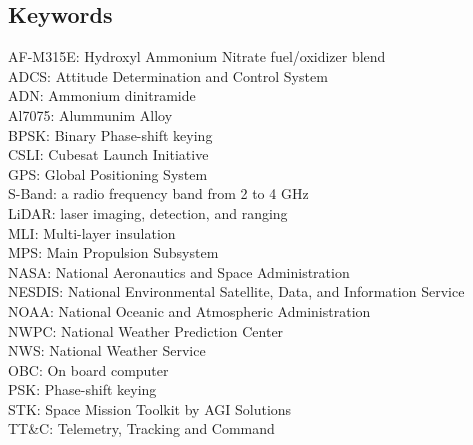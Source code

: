 \newpage
\subsection{Keywords}
AF-M315E: Hydroxyl Ammonium Nitrate fuel/oxidizer blend\\
ADCS: Attitude Determination and Control System\\
ADN: Ammonium dinitramide\\
Al7075: Alummunim Alloy\\
BPSK: Binary Phase-shift keying\\
CSLI: Cubesat Launch Initiative\\
GPS: Global Positioning System\\
S-Band: a radio frequency band from 2 to 4 GHz\\
LiDAR: laser imaging, detection, and ranging\\
MLI: Multi-layer insulation\\
MPS: Main Propulsion Subsystem\\
NASA: National Aeronautics and Space Administration\\
NESDIS: National Environmental Satellite, Data, and Information Service\\
NOAA: National Oceanic and Atmospheric Administration\\
NWPC: National Weather Prediction Center\\
NWS: National Weather Service\\
OBC: On board computer\\
PSK: Phase-shift keying\\
STK: Space Mission Toolkit by AGI Solutions\\
TT\&C: Telemetry, Tracking and Command\\ 
